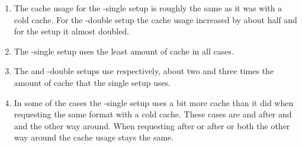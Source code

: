 \documentclass[twoside,openright]{uva-bachelor-thesis}
\begin{document}
\begin{enumerate}
    \item The cache usage for the \lt-single setup is roughly the same as it was
        with a cold cache. For the \lt-double setup the cache usage increased by
        about half and for the \cdn setup it almost doubled.

    \item The \lt-single setup uses the least amount of cache in all cases.

    \item
        The \cdn and \lt-double setups use respectively, about two and three
        times the amount of cache that the \lt single setup uses.

    \item In some of the cases the \lt-single setup uses a bit more cache than
        it did when requesting the same format with a cold cache. These cases
        are \hds and \hls after \dash and \iss and the other way around.  When
        requesting \dash after \iss or \hls after \hds or both the other way
        around the cache usage stays the same.

\end{enumerate}

\FloatBarrier
\end{document}
